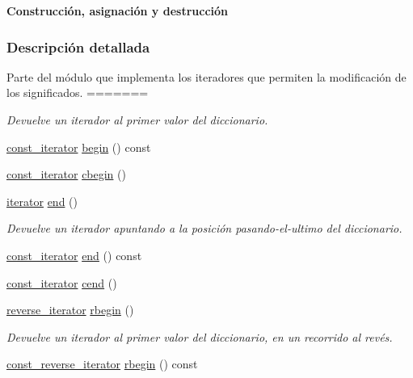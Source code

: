 \begin{Indent}{\bf \-Construcción, asignación y destrucción}
\subsubsection{\-Descripción detallada}
\-Parte del módulo que implementa los iteradores que permiten la modificación de los significados. 
=======
\begin{DoxyCompactList}\small\item\em Devuelve un iterador al primer valor del diccionario. \end{DoxyCompactList}\item 
\hyperlink{classaed2_1_1iterator_1_1const__iterator}{const\+\_\+iterator} \hyperlink{classaed2_1_1iterator_a8a5783a3ab356cd6247b98d302d9130c_a8a5783a3ab356cd6247b98d302d9130c}{begin} () const
\item 
\hyperlink{classaed2_1_1iterator_1_1const__iterator}{const\+\_\+iterator} \hyperlink{classaed2_1_1iterator_a89cca73bd2e4df39de7c412c441d6da1_a89cca73bd2e4df39de7c412c441d6da1}{cbegin} ()
\item 
\hyperlink{classaed2_1_1iterator_1_1iterator}{iterator} \hyperlink{classaed2_1_1iterator_a67caf9468be999e9be96b7add5d79946_a67caf9468be999e9be96b7add5d79946}{end} ()
\begin{DoxyCompactList}\small\item\em Devuelve un iterador apuntando a la posición pasando-\/el-\/ultimo del diccionario. \end{DoxyCompactList}\item 
\hyperlink{classaed2_1_1iterator_1_1const__iterator}{const\+\_\+iterator} \hyperlink{classaed2_1_1iterator_a66ee57cfa3bed6ffa74a1c8c23b13767_a66ee57cfa3bed6ffa74a1c8c23b13767}{end} () const
\item 
\hyperlink{classaed2_1_1iterator_1_1const__iterator}{const\+\_\+iterator} \hyperlink{classaed2_1_1iterator_a2d0d226485d9280d16a739d0b9dae525_a2d0d226485d9280d16a739d0b9dae525}{cend} ()
\item 
\hyperlink{classaed2_1_1iterator_a07b2c0fa31611e03cd019b290acd6d80_a07b2c0fa31611e03cd019b290acd6d80}{reverse\+\_\+iterator} \hyperlink{classaed2_1_1iterator_a296638725dce2fc10316d18563eb3131_a296638725dce2fc10316d18563eb3131}{rbegin} ()
\begin{DoxyCompactList}\small\item\em Devuelve un iterador al primer valor del diccionario, en un recorrido al revés. \end{DoxyCompactList}\item 
\hyperlink{classaed2_1_1iterator_a657402896e5b5966660032f5686cc4c4_a657402896e5b5966660032f5686cc4c4}{const\+\_\+reverse\+\_\+iterator} \hyperlink{classaed2_1_1iterator_a633182fba99ef1a9f10f7bb836f990e0_a633182fba99ef1a9f10f7bb836f990e0}{rbegin} () const

\end{Indent}
